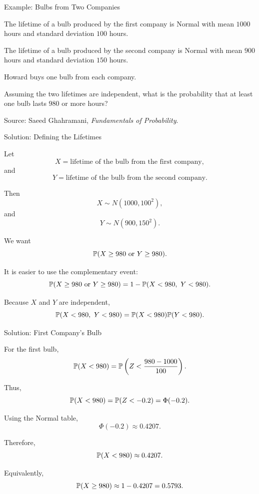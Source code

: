 \begin{frame}{Example: Bulbs from Two Companies}

The lifetime of a bulb produced by the first company is Normal with mean
\(1000\) hours and standard deviation \(100\) hours.

The lifetime of a bulb produced by the second company is Normal with mean
\(900\) hours and standard deviation \(150\) hours.

Howard buys one bulb from each company.

Assuming the two lifetimes are independent, what is the probability that at
least one bulb lasts \(980\) or more hours?

\vfill

{\scriptsize
Source: Saeed Ghahramani, \emph{Fundamentals of Probability}.
}

\end{frame}


\begin{frame}{Solution: Defining the Lifetimes}

Let
\[
X=\text{lifetime of the bulb from the first company},
\]
and
\[
Y=\text{lifetime of the bulb from the second company}.
\]

Then
\[
X\sim N(1000,100^2),
\]
and
\[
Y\sim N(900,150^2).
\]

We want
\[
\Prob(X\geq980\ \text{or}\ Y\geq980).
\]

It is easier to use the complementary event:
\[
\mathbb{P}(X\geq980\ \text{or}\ Y\geq980)
=
1-\mathbb{P}(X<980,\ Y<980).
\]

Because \(X\) and \(Y\) are independent,
\[
\mathbb{P}(X<980,\ Y<980)
=
\mathbb{P}(X<980)\mathbb{P}(Y<980).
\]

\end{frame}


\begin{frame}{Solution: First Company's Bulb}

For the first bulb,
\[
\mathbb{P}(X<980)
=
\mathbb{P}\left(
Z<
\frac{980-1000}{100}
\right).
\]

Thus,
\[
\mathbb{P}(X<980)
=
\mathbb{P}(Z<-0.2)
=
\Phi(-0.2).
\]

Using the Normal table,
\[
\Phi(-0.2)\approx0.4207.
\]

Therefore,
\[
\mathbb{P}(X<980)\approx0.4207.
\]

Equivalently,
\[
\mathbb{P}(X\geq980)
\approx
1-0.4207
=
0.5793.
\]

\end{frame}


